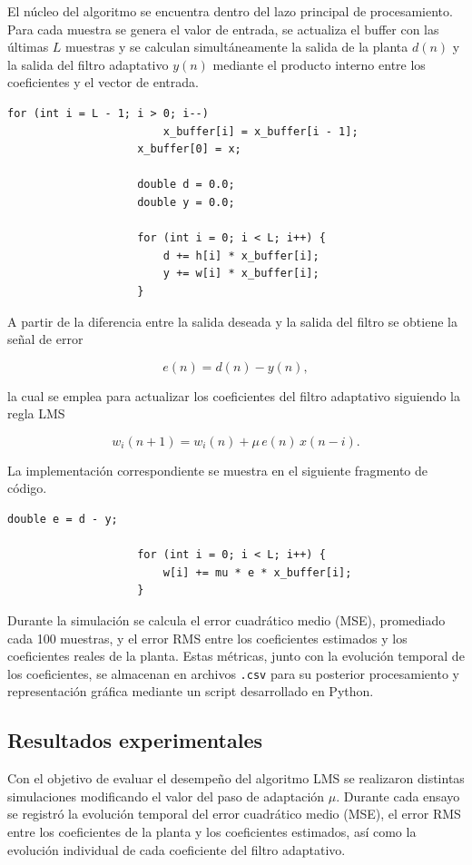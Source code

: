 \documentclass[12pt]{article}
\begin{document}
				El núcleo del algoritmo se encuentra dentro del lazo principal de procesamiento. Para cada muestra se genera el valor de entrada, se actualiza el buffer con las últimas $L$ muestras y se calculan simultáneamente la salida de la planta $d(n)$ y la salida del filtro adaptativo $y(n)$ mediante el producto interno entre los coeficientes y el vector de entrada.

				\begin{lstlisting}[style=mystyle]
					for (int i = L - 1; i > 0; i--)
						x_buffer[i] = x_buffer[i - 1];
					x_buffer[0] = x;

					double d = 0.0;
					double y = 0.0;

					for (int i = 0; i < L; i++) {
						d += h[i] * x_buffer[i];
						y += w[i] * x_buffer[i];
					}
				\end{lstlisting}

				A partir de la diferencia entre la salida deseada y la salida del filtro se obtiene la señal de error

				\[
				e(n)=d(n)-y(n),
				\]

				la cual se emplea para actualizar los coeficientes del filtro adaptativo siguiendo la regla LMS

				\[
				w_i(n+1)=w_i(n)+\mu\,e(n)\,x(n-i).
				\]

				La implementación correspondiente se muestra en el siguiente fragmento de código.

				\begin{lstlisting}[style=mystyle]
					double e = d - y;

					for (int i = 0; i < L; i++) {
						w[i] += mu * e * x_buffer[i];
					}
				\end{lstlisting}

				Durante la simulación se calcula el error cuadrático medio (MSE), promediado cada 100 muestras, y el error RMS entre los coeficientes estimados y los coeficientes reales de la planta. Estas métricas, junto con la evolución temporal de los coeficientes, se almacenan en archivos \texttt{.csv} para su posterior procesamiento y representación gráfica mediante un script desarrollado en Python.

		\subsection{Resultados experimentales}

			Con el objetivo de evaluar el desempeño del algoritmo LMS se realizaron distintas simulaciones modificando el valor del paso de adaptación $\mu$. Durante cada ensayo se registró la evolución temporal del error cuadrático medio (MSE), el error RMS entre los coeficientes de la planta y los coeficientes estimados, así como la evolución individual de cada coeficiente del filtro adaptativo.
\end{document}
